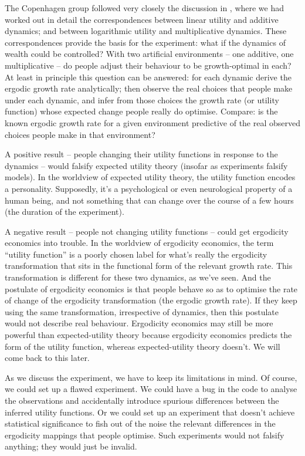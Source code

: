 The Copenhagen group followed very closely the discussion in \cite{PetersGell-Mann2016}, where 
we had worked out in detail the correspondences between linear utility and additive dynamics; and between 
logarithmic utility and multiplicative dynamics. These correspondences provide the basis for 
the experiment: what if the dynamics of wealth could be controlled? With two artificial 
environments -- one additive,  one multiplicative -- do people adjust their behaviour to be 
growth-optimal in each? At least in principle this question can be answered: for each dynamic
derive the ergodic growth rate analytically; then observe the 
real choices that people make under each dynamic, and infer from those choices 
the growth rate (or utility function) whose expected change people really do optimise. Compare: is the 
known ergodic growth rate for a given environment predictive of the real observed choices people make 
in that environment?

A positive result -- people changing their utility functions in response to the dynamics -- would falsify 
expected utility theory (insofar as experiments falsify models). In the worldview of expected 
utility theory, the utility function encodes a personality. Supposedly, it's a psychological or 
even neurological property of a human being, and not something that can change over the 
course of a few hours (the duration of the experiment). 

A negative result -- people not changing utility functions -- could get ergodicity economics into trouble. 
In the worldview of ergodicity economics, the term ``utility function'' 
is a poorly chosen label for what's really the ergodicity transformation that sits in the functional 
form of the relevant growth rate. This transformation is different for these two dynamics, as we've 
seen. And the postulate of ergodicity economics is that people behave so as to optimise the 
rate of change of the ergodicity transformation (\ie the ergodic growth rate). If they keep using the 
same transformation, irrespective of dynamics, then this postulate would 
not describe real behaviour. Ergodicity economics may still be more powerful than expected-utility 
theory because ergodicity economics predicts the form of the utility function, whereas 
expected-utility theory doesn't. We will come back to this later.

As we discuss the experiment, we have to keep its limitations in mind. Of course, 
we could set up a flawed experiment. We could have a bug in the code to analyse the 
observations and accidentally introduce spurious differences between the inferred utility functions. 
Or we could set up an experiment that doesn't achieve statistical significance to fish out 
of the noise the relevant differences in the ergodicity mappings that people optimise. 
Such experiments would not falsify anything; they would just be invalid. 

